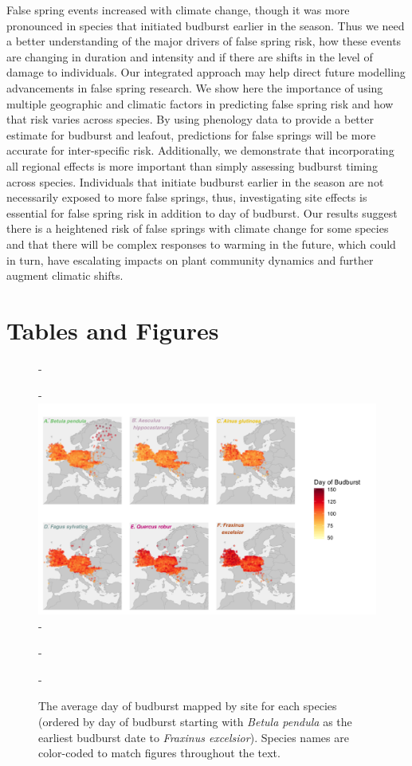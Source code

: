 \documentclass{article}\usepackage[]{graphicx}\usepackage[]{color}
\begin{document}
False spring events increased with climate change, though it was more pronounced in species that initiated budburst earlier in the season. Thus we need a better understanding of the major drivers of false spring risk, how these events are changing in duration and intensity and if there are shifts in the level of damage to individuals. Our integrated approach may help direct future modelling advancements in false spring research. We show here the importance of using multiple geographic and climatic factors in predicting false spring risk and how that risk varies across species. By using phenology data to provide a better estimate for budburst and leafout, predictions for false springs will be more accurate for inter-specific risk. Additionally, we demonstrate that incorporating all regional effects is more important than simply assessing budburst timing across species. Individuals that initiate budburst earlier in the season are not necessarily exposed to more false springs, thus, investigating site effects is essential for false spring risk in addition to day of budburst. Our results suggest there is a heightened risk of false springs with climate change for some species and that there will be complex responses to warming in the future, which could in turn, have escalating impacts on plant community dynamics and further augment climatic shifts. 



\section*{Tables and Figures} 

{\begin{figure} [H]
  -\begin{center}
  -\includegraphics[width=14cm]{..//analyses/figures/BB_base.png}
  -\caption{The average day of budburst mapped by site for each species (ordered by day of budburst starting with \textit{Betula pendula} as the earliest budburst date to \textit{Fraxinus excelsior}). Species names are color-coded to match figures throughout the text. }\label{fig:bbmap}
  -\end{center}
  -\end{figure}}
  
\end{document}
